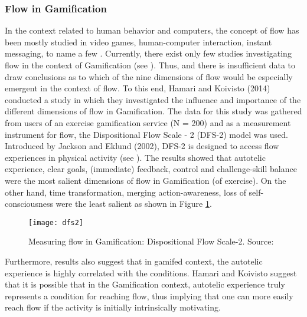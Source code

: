\subsubsection{Flow in Gamification}
In the context related to human behavior and computers, the concept of flow has been mostly studied in video games, human-computer interaction, instant messaging, to name a few \cite{hamari2014measuring}. Currently, there exist only few studies investigating flow in the context of Gamification (see \cite{hamari2014measuring, sillaots2014achieving}). Thus, and there is insufficient data to draw conclusions as to which of the nine dimensions of flow would be especially emergent in the context of flow. To this end, Hamari and Koivisto (2014) conducted a study in which they investigated the influence and importance of the different dimensions of flow in Gamification.  The data for this study was gathered from users of an exercise gamification service (N = 200) and as a measurement instrument for flow, the Dispositional Flow Scale - 2 (DFS-2) model was used. Introduced by Jackson and Eklund (2002), DFS-2 is designed to access flow experiences in physical activity (see \cite{jackson2002assessing}). The results showed that autotelic experience, clear goals, (immediate) feedback, control and challenge-skill balance were the most salient dimensions of flow in Gamification (of exercise). On the other hand, time transformation, merging action-awareness, loss of self-consciousness were the least salient as shown in Figure \ref{fig:dfs2}.
\begin{figure}[h]
    \centering
    \texttt{[image: dfs2]}
    \caption{Measuring flow in Gamification: Dispositional Flow Scale-2. Source:  \cite{dfs2}}
    \label{fig:dfs2}
\end{figure}
Furthermore, results also suggest that in gamifed context, the autotelic experience is highly correlated with the conditions. Hamari and Koivisto suggest that it is possible that in the Gamification context, autotelic experience truly represents a condition for reaching flow, thus implying that one can more easily reach flow if the activity is initially intrinsically motivating. 
